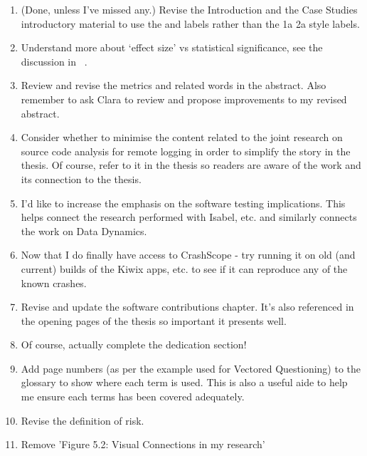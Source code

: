 \begin{enumerate}
    \item (Done, unless I've missed any.) Revise the Introduction and the Case Studies introductory material to use the \uuse and \iuse labels rather than the 1a 2a style labels.

    \item Understand more about `effect size' vs statistical significance, see the discussion in ~\citep[p.135]{Ko2015_a_practical_guide_to_controlled_experiments_of_sw_eng_tools_with_human_participants}.

    \item Review and revise the metrics and related words in the abstract. Also remember to ask Clara to review and propose improvements to my revised abstract.

    \item Consider whether to minimise the content related to the joint research on source code analysis for remote logging in order to simplify the story in the thesis. Of course, refer to it in the thesis so readers are aware of the work and its connection to the thesis.

    \item I'd like to increase the emphasis on the software testing implications. This helps connect the research performed with Isabel, etc. and similarly connects the work on Data Dynamics.

    \item Now that I do finally have access to CrashScope - try running it on old (and current) builds of the Kiwix apps, etc. to see if it can reproduce any of the known crashes.

    \item Revise and update the software contributions chapter. It's also referenced in the opening pages of the thesis so important it presents well.

    \item Of course, actually complete the dedication section!

    \item Add page numbers (as per the example used for Vectored Questioning) to the glossary to show where each term is used. This is also a useful aide to help me ensure each terms has been covered adequately.

    \item Revise the definition of risk.

    \item Remove 'Figure 5.2: Visual Connections in my research'


\end{enumerate}
